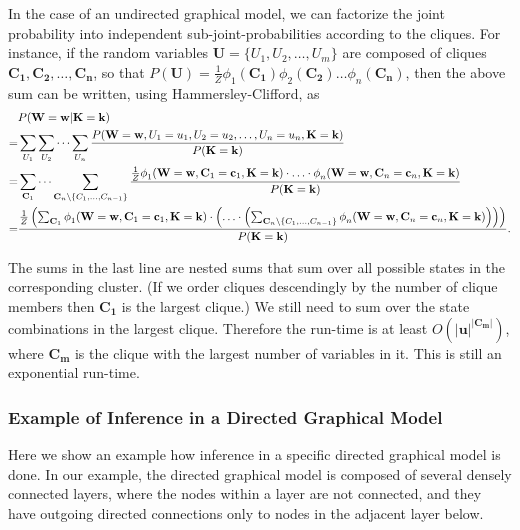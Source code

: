 In the case of an undirected graphical model, we can factorize the
joint probability into independent sub-joint-probabilities according
to the cliques. For instance, if the random variables $\mathbf{U}=\{U_{1},U_{2},\dots,U_{m}\}$
are composed of cliques $\mathbf{C_{1}},\mathbf{C_{2}},\dots,\mathbf{C_{n}}$,
so that $P(\mathbf{U})=\frac{1}{Z}\phi_{1}(\mathbf{C_{1}})\phi_{2}(\mathbf{C_{2}})\dots\phi_{n}(\mathbf{C_{n}})$,
then the above sum can be written, using Hammersley-Clifford, as
\begin{eqnarray*}
 & P(\mathbf{W}=\mathbf{w}|\mathbf{K}=\mathbf{k})\\
= & \sum_{U_{1}}\sum_{U_{2}}\cdots\sum_{U_{n}}\frac{P(\mathbf{W}=\mathbf{w},U_{1}=u_{1},U_{2}=u_{2},\dots,U_{n}=u_{n},\mathbf{K}=\mathbf{k})}{P(\mathbf{K}=\mathbf{k})}\\
= & \sum_{\mathbf{C}_{1}}\cdots\sum_{\mathbf{C}_{n}\backslash\{C_{1},\dots,C_{n-1}\}}\frac{\frac{1}{Z}\mbox{\ensuremath{\phi}}_{1}(\mathbf{W}=\mathbf{w},\mathbf{C}_{1}=\mathbf{c}_{1},\mathbf{K}=\mathbf{k})\cdot\ldots\cdot\mbox{\ensuremath{\phi}}_{n}(\mathbf{W}=\mathbf{w},\mathbf{C}_{n}=\mathbf{c}_{n},\mathbf{K}=\mathbf{k})}{P(\mathbf{K}=\mathbf{k})}\\
= & \frac{\frac{1}{Z}\left(\sum_{\mathbf{C}_{1}}\mbox{\ensuremath{\phi}}_{1}(\mathbf{W}=\mathbf{w},\mathbf{C}_{1}=\mathbf{c}_{1},\mathbf{K}=\mathbf{k})\cdot\left(\ldots\cdot\left(\sum_{\mathbf{C}_{n}\backslash\{C_{1},\dots,C_{n-1}\}}\mbox{\ensuremath{\phi}}_{n}(\mathbf{W}=\mathbf{w},\mathbf{C}_{n}=\mathbf{c}_{n},\mathbf{K}=\mathbf{k})\right)\right)\right)}{P(\mathbf{K}=\mathbf{k})}.
\end{eqnarray*}

The sums in the last line are nested sums that sum over all possible
states in the corresponding cluster. (If we order cliques descendingly
by the number of clique members then $\mathbf{C_{1}}$ is the largest
clique.) We still need to sum over the state combinations in the largest
clique. Therefore the run-time is at least $O(|\mathbf{u}|^{|\mathbf{C_{m}}|})$,
where $\mathbf{C_{m}}$ is the clique with the largest number of variables
in it. This is still an exponential run-time.


\subsubsection{Example of Inference in a Directed Graphical Model\label{subsec:Example-of-Exact-Inference-in-a-directed-graphical-model}}

Here we show an example how inference in a specific directed graphical
model is done. In our example, the directed graphical model is composed
of several densely connected layers, where the nodes within a layer
are not connected, and they have outgoing directed connections only
to nodes in the adjacent layer below.

